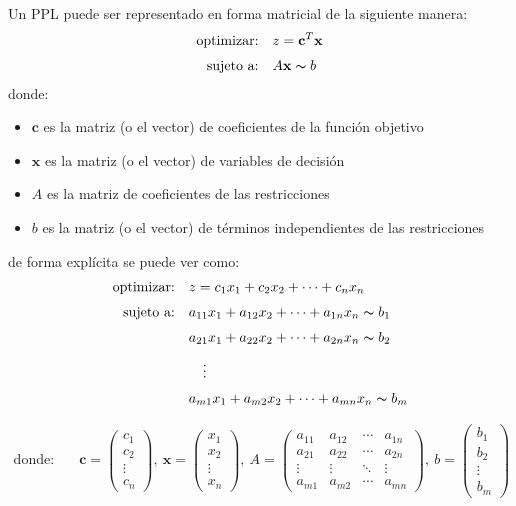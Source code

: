 Un PPL puede ser representado en forma matricial de la siguiente manera:
\begin{align*}
  \text{optimizar:} \quad   &z = \mathbf{c}^T\mathbf{x} \\[3pt]
  \text{sujeto a:} \quad    &A\mathbf{x} \thicksim  b \\
\end{align*}
donde:
\begin{itemize}
  \item \(\mathbf{c}\) es la matriz (o el vector) de coeficientes de la función objetivo
  \item \(\mathbf{x}\) es la matriz (o el vector) de variables de decisión
  \item \(A\) es la matriz de coeficientes de las restricciones
  \item \(b\) es la matriz (o el vector) de términos independientes de las restricciones
\end{itemize}
de forma explícita se puede ver como:
\begin{align*}
  \text{optimizar:} \quad   &z = c_{1}x_{1} + c_{2}x_{2} + \cdots + c_{n}x_{n} \\[3pt]
  \text{sujeto a:} \quad    &a_{11}x_{1} + a_{12}x_{2} + \cdots + a_{1n}x_{n} \thicksim b_{1} \\[3pt]
                            &a_{21}x_{1} + a_{22}x_{2} + \cdots + a_{2n}x_{n} \thicksim b_{2} \\[3pt]
                            &\quad \vdots \\[3pt]
                            &a_{m1}x_{1} + a_{m2}x_{2} + \cdots + a_{mn}x_{n} \thicksim b_{m} \\[3pt]
\end{align*}
\begin{align*}
  \text{donde:} \quad       &\mathbf{c} = \begin{pmatrix} c_1 \\ c_2 \\ \vdots \\ c_n \end{pmatrix},\ \mathbf{x} = \begin{pmatrix} x_1 \\ x_2 \\ \vdots \\ x_n \end{pmatrix},\ A = \begin{pmatrix} a_{11} & a_{12} & \cdots & a_{1n} \\ a_{21} & a_{22} & \cdots & a_{2n} \\ \vdots & \vdots & \ddots & \vdots \\ a_{m1} & a_{m2} & \cdots & a_{mn} \end{pmatrix},\ b = \begin{pmatrix} b_1 \\ b_2 \\ \vdots \\ b_m \end{pmatrix}
\end{align*}


